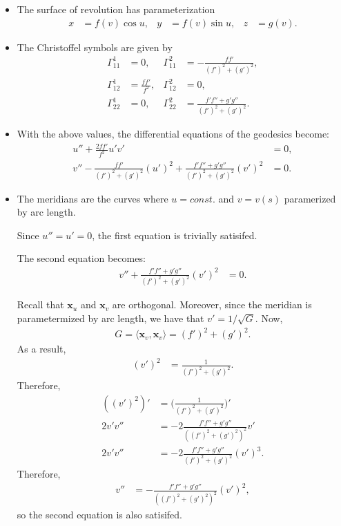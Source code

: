 \documentclass[10pt]{article}
\newcommand{\ve}[1]{\mathbf{#1}}
\begin{document}
  \begin{itemize}
    \item The surface of revolution has parameterization
    \begin{align*}
      x &= f(v) \cos u, & y &= f(v) \sin u,& z &= g(v).
    \end{align*}
    
    \item The Christoffel symbols are given by
    \begin{align*}
      \Gamma_{11}^1 &= 0, & 
      \Gamma_{11}^2 &= - \frac{ff'}{(f')^2 + (g')^2}, \\
      \Gamma_{12}^1 &= \frac{ff'}{f^2}, &
      \Gamma_{12}^2 &= 0, \\
      \Gamma_{22}^1 &= 0, &
      \Gamma_{22}^2 &= \frac{f'f'' + g'g''}{(f')^2 + (g')^2}.
    \end{align*}
    
    \item With the above values, the differential equations of the geodesics become:
    \begin{align*}
      u'' + \frac{2ff'}{f^2}u'v' &= 0,\\
      v'' - \frac{ff'}{(f')^2 + (g')^2}(u')^2 + \frac{f'f'' + g'g''}{(f')^2 + (g')^2}(v')^2 &= 0.
    \end{align*}

    \item The meridians are the curves where $u = const.$ and $v = v(s)$ paramerized by arc length. 

    Since $u'' = u' = 0$, the first equation is trivially satisifed. 

    The second equation becomes:
    \begin{align*}
      v'' + \frac{f'f'' + g'g''}{(f')^2 + (g')^2}(v')^2 &= 0.
    \end{align*}

    Recall that $\ve{x}_u$ and $\ve{x}_v$ are orthogonal. Moreover, since the meridian is parametermized by arc length, we have that $v' = 1 / \sqrt{G}$. Now,
    \begin{align*}
      G = \langle \ve{x}_v, \ve{x}_v \rangle = (f')^2 + (g')^2.
    \end{align*}
    As a result,
    \begin{align*}
      (v')^2 &= \frac{1}{(f')^2 + (g')^2}.
    \end{align*}
    Therefore,
    \begin{align*}
      ((v')^2)'
      &= \bigg( \frac{1}{(f')^2 + (g')^2} \bigg)'\\
      2v'v''
      &= -2 \frac{f'f'' + g'g''}{((f')^2 + (g')^2)^2} v'\\
      2v'v''
      &= -2 \frac{f'f'' + g'g''}{(f')^2 + (g')^2} (v')^3.
    \end{align*}
    Therefore,
    \begin{align*}
      v'' &= -\frac{f'f'' + g'g''}{((f')^2 + (g')^2)^2} (v')^2,
    \end{align*}
    so the second equation is also satisifed.


\end{itemize}
\end{document}
